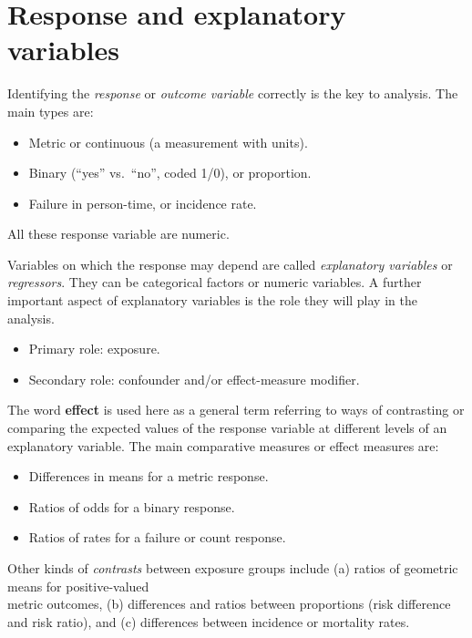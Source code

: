 \documentclass[
]{book}
\providecommand{\tightlist}{%
  \setlength{\itemsep}{0pt}\setlength{\parskip}{0pt}}
\begin{document}
\section{Response and explanatory variables}\label{response-and-explanatory-variables}

Identifying the \emph{response} or \emph{outcome variable} correctly is the key
to analysis. The main types are:

\begin{itemize}
\tightlist
\item
  Metric or continuous (a measurement with units).
\item
  Binary (``yes'' vs.~``no'', coded 1/0), or proportion.
\item
  Failure in person-time, or incidence rate.
\end{itemize}

All these response variable are numeric.

Variables on which the response may depend are called \emph{explanatory
variables} or \emph{regressors}. They can be categorical factors or numeric variables.
A further important aspect of explanatory variables is the role they will play in the analysis.

\begin{itemize}
\tightlist
\item
  Primary role: exposure.
\item
  Secondary role: confounder and/or effect-measure modifier.
\end{itemize}

The word \textbf{effect}
is used here as a general term referring to ways of
contrasting or comparing the expected values of the response variable at
different levels of an explanatory
variable. The main comparative measures or effect measures are:

\begin{itemize}
\tightlist
\item
  Differences in means for a metric response.
\item
  Ratios of odds for a binary response.
\item
  Ratios of rates for a failure or count response.
\end{itemize}

Other kinds of \emph{contrasts} between exposure groups
include (a) ratios of geometric means for positive-valued\\
metric outcomes,
(b) differences and ratios between proportions
(risk difference and risk ratio), and (c)
differences between incidence or mortality rates.
\end{document}
